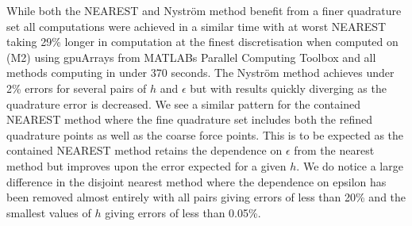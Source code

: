 While both the NEAREST and  Nyström  method benefit from a finer quadrature set all computations were achieved in a similar time with at worst NEAREST taking 29\% longer in computation at the finest discretisation when computed on (M2) using gpuArrays from MATLABs Parallel Computing Toolbox \cite{Gallagher2020} and all methods computing in under 370 seconds. The Nyström method achieves under 2\% errors for several pairs of $h$ and $\epsilon$ but with results quickly diverging as the quadrature error is decreased. We see a similar pattern for the contained NEAREST method where the fine quadrature set includes both the refined quadrature points as well as the coarse force points. This is to be expected as the contained NEAREST method retains the dependence on $\epsilon$ from the nearest method but improves upon the error expected for a given $h$. We do notice a large difference in the disjoint nearest method where the dependence on epsilon has been removed almost entirely with all pairs giving errors of less than 20\% and the smallest values of $h$ giving errors of less than 0.05\%. 
